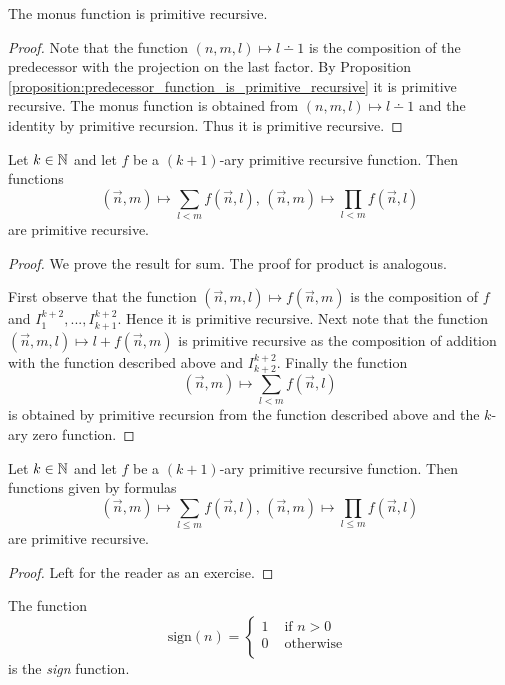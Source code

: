 \documentclass[10pt]{amsart}
\begin{document}
\begin{proposition}\label{proposition:monus_function_is_primitive_recursive}
	The monus function is primitive recursive.
\end{proposition}
\begin{proof}
	Note that the function $(n,m,l) \mapsto l\dotminus 1$ is the composition of the predecessor with the projection on the last factor. By Proposition \ref{proposition:predecessor_function_is_primitive_recursive} it is primitive recursive. The monus function is obtained from $(n,m,l)\mapsto l \dotminus 1$ and the identity by primitive recursion. Thus it is primitive recursive.
\end{proof}

\begin{proposition}\label{proposition:fold_mechanism_for_sum_and_product_is_primitive_recursive}
	Let $k\in {\mathbb N}$ and let $f$ be a $(k+1)$-ary primitive recursive function. Then functions
	$$(\vec{n},m)\mapsto \sum_{l < m}f(\vec{n},l),\,(\vec{n},m) \mapsto \prod_{l < m}f(\vec{n},l)$$
	are primitive recursive.
\end{proposition}
\begin{proof}
	We prove the result for sum. The proof for product is analogous.

	First observe that the function $(\vec{n},m,l) \mapsto f(\vec{n},m)$ is the composition of $f$ and $I^{k+2}_1,...,I^{k+2}_{k+1}$. Hence it is primitive recursive. Next note that the function $(\vec{n},m,l) \mapsto l + f(\vec{n},m)$ is primitive recursive  as the composition of addition with the function described above and $I^{k+2}_{k+2}$. Finally the function
	$$(\vec{n},m)\mapsto \sum_{l < m}f(\vec{n},l)$$
	is obtained by primitive recursion from the function described above and the $k$-ary zero function.
\end{proof}

\begin{corollary}\label{corollary:fold_mechanism_for_sum_and_product_is_primitive_recursive}
	Let $k\in {\mathbb N}$ and let $f$ be a $(k + 1)$-ary primitive recursive function. Then functions given by formulas
	$$(\vec{n},m)\mapsto \sum_{l \leq m}f(\vec{n},l),\,(\vec{n},m) \mapsto \prod_{l \leq m}f(\vec{n},l)$$
	are primitive recursive.
\end{corollary}
\begin{proof}
	Left for the reader as an exercise.
\end{proof}

\begin{definition}
	The function
	$$\mathrm{sign}(n) = \begin{cases}
			1 & \mbox{ if }n > 0   \\
			0 & \mbox{ otherwise } \\
		\end{cases}$$
	is the \textit{sign} function.
\end{definition}
\end{document}
